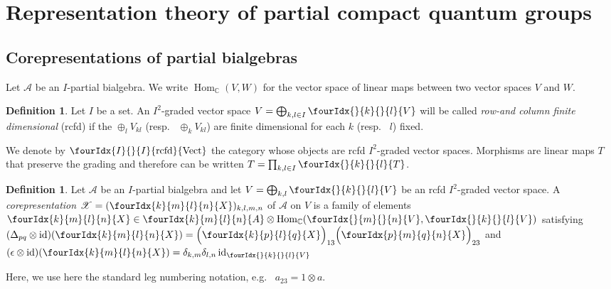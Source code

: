 \documentclass[10pt]{article}
\DeclareMathOperator{\id}{id}
\DeclareMathOperator{\Hom}{Hom}
\DeclareMathOperator{\rcf}{\mathrm{rcfd}}
\newcommand{\C}{\mathbb{C}}
\newcommand{\Vectrcf}{\Gr{\mathrm{Vect}}{I}{I}{}{\rcf}}
\newcommand{\Gr}[5]{\fourIdx{#2}{#4}{#3}{#5}{#1}}%
\newcommand{\Gru}[3]{\Gr{#1}{}{}{#2}{#3}}
\theoremstyle{definition}
\newtheorem{Def}[Theorem]{Definition}
\numberwithin{equation}{section}
\begin{document}

\section{Representation theory of partial compact quantum groups}

\subsection{Corepresentations of partial bialgebras}

Let $\mathscr{A}$ be an $I$-partial bialgebra. We write
$\Hom_\C(V,W)$ for the vector space of linear maps between two vector
spaces $V$ and $W$.


\begin{Def} Let $I$ be a set. An $I^{2}$-graded vector space $V=\bigoplus_{k,l\in I} \Gru{V}{k}{l}$ will be called \emph{row-and column finite dimensional} (rcfd) if the $\oplus_l V_{kl}$ (resp.~ $\oplus_k V_{kl}$) are finite dimensional for each $k$ (resp.~ $l$) fixed. 
\end{Def} 

We denote by  $\Vectrcf$ the category whose objects are rcfd $I^{2}$-graded vector spaces. Morphisms are linear maps $T$ that preserve the grading and therefore
can be written $T=\prod_{k,l\in I} \Gru{T}{k}{l}$. 

\begin{Def} \label{definition:corep} Let $\mathscr{A}$ be an
  $I$-partial bialgebra and let $V=\bigoplus_{k,l} \Gru{V}{k}{l}$
   be
an rcfd $I^{2}$-graded vector space.  A \emph{corepresentation}
  $\mathscr{X}=(\Gr{X}{k}{l}{m}{n})_{k,l,m,n}$ of $\mathscr{A}$ on $V$
  is a family of elements $\Gr{X}{k}{l}{m}{n} \in \Gr{A}{k}{l}{m}{n} \otimes
  \Hom_\C(\Gru{V}{m}{n},\Gru{V}{k}{l})$
 satisfying $ (\Delta_{pq} \otimes
    \id)(\Gr{X}{k}{l}{m}{n}) =
    \Big{(}\Gr{X}{k}{l}{p}{q}\Big{)}_{13}\Big{(}\Gr{X}{p}{q}{m}{n}\Big{)}_{23}$ and
     $(\epsilon \otimes
  \id)(\Gr{X}{k}{l}{m}{n})=\delta_{k,m}\delta_{l,n}\id_{\Gru{V}{k}{l}}$
\end{Def}
Here, we use here the standard leg numbering notation, e.g.~ $a_{23}=1\otimes a$. 
\end{document}
